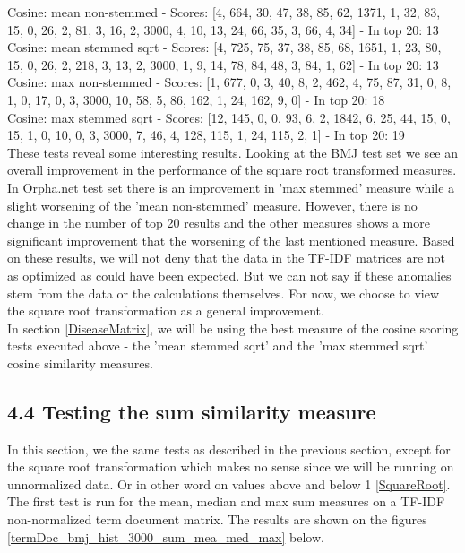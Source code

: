  
Cosine: mean non-stemmed - Scores: [4, 664, 30, 47, 38, 85, 62, 1371, 1, 32, 83, 15, 0, 26, 2, 81, 3, 16, 2, 3000, 4, 10, 13, 24, 66, 35, 3, 66, 4, 34] - In top 20: 13 \\
Cosine: mean stemmed sqrt - Scores: [4, 725, 75, 37, 38, 85, 68, 1651, 1, 23, 80, 15, 0, 26, 2, 218, 3, 13, 2, 3000, 1, 9, 14, 78, 84, 48, 3, 84, 1, 62] - In top 20: 13 \\
Cosine: max non-stemmed - Scores: [1, 677, 0, 3, 40, 8, 2, 462, 4, 75, 87, 31, 0, 8, 1, 0, 17, 0, 3, 3000, 10, 58, 5, 86, 162, 1, 24, 162, 9, 0] - In top 20: 18 \\
Cosine: max stemmed sqrt - Scores: [12, 145, 0, 0, 93, 6, 2, 1842, 6, 25, 44, 15, 0, 15, 1, 0, 10, 0, 3, 3000, 7, 46, 4, 128, 115, 1, 24, 115, 2, 1] - In top 20: 19 \\

These tests reveal some interesting results. Looking at the BMJ test set we see an overall improvement in the performance of the square root transformed measures. In Orpha.net test set there is an improvement in 'max stemmed' measure while a slight worsening of the 'mean non-stemmed' measure. However, there is no change in the number of top 20 results and the other measures shows a more significant improvement that the worsening of the last mentioned measure. Based on these results, we will not deny that the data in the TF-IDF matrices are not as optimized as could have been expected. But we can not say if these anomalies stem from the data or the calculations themselves. For now, we choose to view the square root transformation as a general improvement. \\

In section \ref{DiseaseMatrix}, we will be using the best measure of the cosine scoring tests executed above - the 'mean stemmed sqrt' and the 'max stemmed sqrt' cosine similarity measures.

\subsection{4.4 Testing the sum similarity measure\label{TestingSumSimilarity}}

In this section, we the same tests as described in the previous section, except for the square root transformation which makes no sense since we will be running on unnormalized data. Or in other word on values above and below 1 \ref{SquareRoot}. The first test is run for the mean, median and max sum measures on a TF-IDF non-normalized term document matrix. The results are shown on the figures \ref{termDoc_bmj_hist_3000_sum_mea_med_max} below. 

